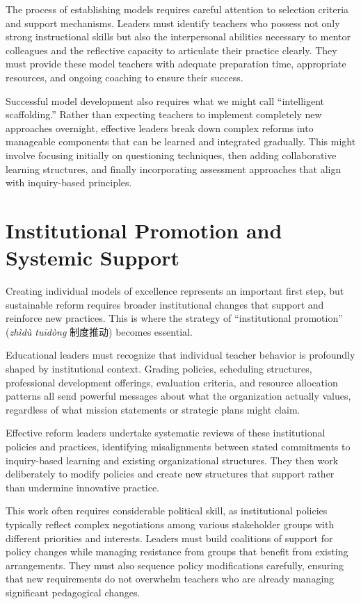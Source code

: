 \documentclass[
  Letterpaper,
]{scrbook}
\begin{document}
The process of establishing models requires careful attention to
selection criteria and support mechanisms. Leaders must identify
teachers who possess not only strong instructional skills but also the
interpersonal abilities necessary to mentor colleagues and the
reflective capacity to articulate their practice clearly. They must
provide these model teachers with adequate preparation time, appropriate
resources, and ongoing coaching to ensure their success.

Successful model development also requires what we might call
``intelligent scaffolding.'' Rather than expecting teachers to implement
completely new approaches overnight, effective leaders break down
complex reforms into manageable components that can be learned and
integrated gradually. This might involve focusing initially on
questioning techniques, then adding collaborative learning structures,
and finally incorporating assessment approaches that align with
inquiry-based principles.

\section{Institutional Promotion and Systemic
Support}\label{institutional-promotion-and-systemic-support}

Creating individual models of excellence represents an important first
step, but sustainable reform requires broader institutional changes that
support and reinforce new practices. This is where the strategy of
``institutional promotion'' (\emph{zhìdù tuīdòng} 制度推动) becomes
essential.

Educational leaders must recognize that individual teacher behavior is
profoundly shaped by institutional context. Grading policies, scheduling
structures, professional development offerings, evaluation criteria, and
resource allocation patterns all send powerful messages about what the
organization actually values, regardless of what mission statements or
strategic plans might claim.

Effective reform leaders undertake systematic reviews of these
institutional policies and practices, identifying misalignments between
stated commitments to inquiry-based learning and existing organizational
structures. They then work deliberately to modify policies and create
new structures that support rather than undermine innovative practice.

This work often requires considerable political skill, as institutional
policies typically reflect complex negotiations among various
stakeholder groups with different priorities and interests. Leaders must
build coalitions of support for policy changes while managing resistance
from groups that benefit from existing arrangements. They must also
sequence policy modifications carefully, ensuring that new requirements
do not overwhelm teachers who are already managing significant
pedagogical changes.
\end{document}
